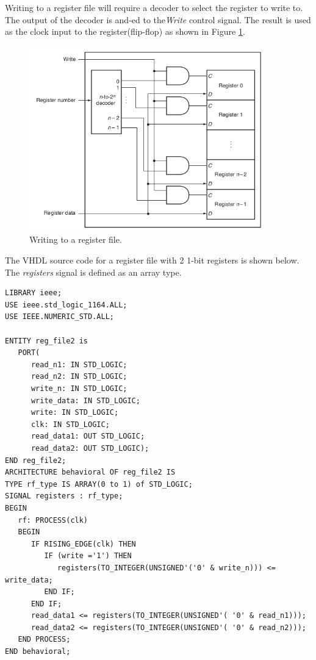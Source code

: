 \documentclass[a4paper, 11pt,oneside]{article}
\begin{document}
Writing to a register file will require a decoder to select the register to 
write to. The output of the decoder is and-ed to the\textit{Write} control 
signal. The result is used as the clock input to the register(flip-flop) as 
shown in Figure \ref{fig:rf2}. 

\begin{figure}[H]
	\begin{center}
	\includegraphics[width=4in]{rf2.png}
	\caption{Writing to a register file.}
	\label{fig:rf2} 
	\end{center}
\end{figure}

The VHDL source code for a register file with 2 1-bit registers is shown below. 
The \textit{registers} signal is defined as an array type. 
\begin{verbatim}
LIBRARY ieee;
USE ieee.std_logic_1164.ALL;
USE IEEE.NUMERIC_STD.ALL;

ENTITY reg_file2 is
   PORT( 
      read_n1: IN STD_LOGIC;
      read_n2: IN STD_LOGIC;
      write_n: IN STD_LOGIC;
      write_data: IN STD_LOGIC;
      write: IN STD_LOGIC;
      clk: IN STD_LOGIC;
      read_data1: OUT STD_LOGIC;
      read_data2: OUT STD_LOGIC);
END reg_file2;
ARCHITECTURE behavioral OF reg_file2 IS
TYPE rf_type IS ARRAY(0 to 1) of STD_LOGIC;
SIGNAL registers : rf_type;
BEGIN
   rf: PROCESS(clk)
   BEGIN
      IF RISING_EDGE(clk) THEN
         IF (write ='1') THEN
            registers(TO_INTEGER(UNSIGNED'('0' & write_n))) <= write_data;
         END IF;
      END IF;
      read_data1 <= registers(TO_INTEGER(UNSIGNED'( '0' & read_n1)));
      read_data2 <= registers(TO_INTEGER(UNSIGNED'( '0' & read_n2)));
   END PROCESS;
END behavioral;
\end{verbatim}
\end{document}
